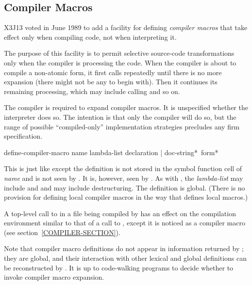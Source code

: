 \begin{newer}
\section{Compiler Macros}

X3J13 voted in June 1989 
to add a facility for defining \emph{compiler macros} that
take effect only when compiling code, not when interpreting it.

The purpose of this facility is to permit selective source-code
transformations only when the compiler is processing the code.
When the compiler is about to compile a non-atomic form, it first calls
 repeatedly until there is no more expansion
(there might not be any to begin with).  Then it continues its
remaining processing, which may include calling  and so on.

The compiler is required to expand compiler macros.  It is unspecified
whether the interpreter does so.  The intention is that only the
compiler will do so, but the range of possible ``compiled-only''
implementation strategies precludes any firm specification.


\begin{defmac}
define-compiler-macro name lambda-list
                      {declaration | doc-string}* {\,form}*

  This is just like  except the definition is not stored in the
  symbol function cell of \emph{name} and is not seen by .
  It is, however, seen by .  As with , the
  \emph{lambda-list} may include  and 
  and may include destructuring.  The definition is
  global.  (There is no provision for defining local compiler
  macros in the way that  defines local macros.)

  A top-level call to  in a file being compiled by
   has an effect on the compilation environment similar to
  that of a call to , except it is noticed as a
  compiler macro (see section~\ref{COMPILER-SECTION}).

Note that compiler macro definitions do not appear in information returned by
; they are global, and their interaction
with other lexical and global definitions can be reconstructed by
.  It is up to code-walking programs to decide
whether to invoke compiler macro expansion.



\end{defmac}
\end{newer}
